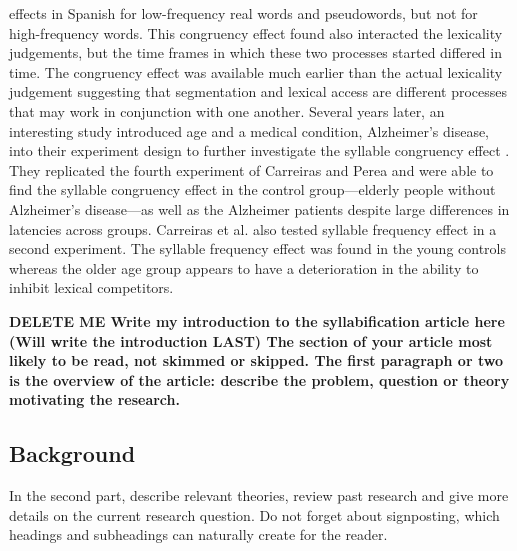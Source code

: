effects in Spanish for low-frequency real words and pseudowords, but not for high-frequency words. This congruency effect found also interacted the lexicality judgements, but the time frames in which these two processes started differed in time. The congruency effect was available much earlier than the actual lexicality judgement suggesting that segmentation and lexical access are different processes that may work in conjunction with one another. Several years later, an interesting study introduced age and a medical condition, Alzheimer’s disease, into their experiment design to further investigate the syllable congruency effect \citep{Carreiras2008-ar}. They replicated the fourth experiment of Carreiras and Perea \parencite*{Carreiras2002-mp} and were able to find the syllable congruency effect in the control group—elderly people without Alzheimer’s disease—as well as the Alzheimer patients despite large differences in latencies across groups. Carreiras et al. \parencite*{Carreiras2008-ar} also tested syllable frequency effect in a second experiment. The syllable frequency effect was found in the young controls whereas the older age group appears to have a deterioration in the ability to inhibit lexical competitors.

\textbf{DELETE ME Write my introduction to the syllabification article here (Will write the introduction LAST)
The section of your article most likely to be read, not skimmed or skipped. The first paragraph or two is the overview of the article: describe the problem, question or theory motivating the research. }

\subsection{Background}

In the second part, describe relevant theories, review past research and give more details on the current research question. Do not forget about signposting, which headings and subheadings can naturally create for the reader.


